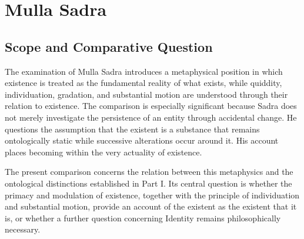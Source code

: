 %
%
%
%

\section{Mulla Sadra}
\label{sec:ch08_s17}



\subsection{Scope and Comparative Question}
\label{subsec:ch08_s17_ss01}

\label{para:VS.B01.P01.C08.S17.SS01.P001}

The examination of Mulla Sadra introduces a metaphysical
position in which existence is treated as the fundamental
reality of what exists, while quiddity, individuation,
gradation, and substantial motion are understood through
their relation to existence. The comparison is especially
significant because Sadra does not merely investigate
the persistence of an entity through accidental change.
He questions the assumption that the existent is a
substance that remains ontologically static while
successive alterations occur around it. His account
places becoming within the very actuality of existence.

The present comparison concerns the relation between
this metaphysics and the ontological distinctions
established in Part I. Its central question is whether
the primacy and modulation of existence, together with
the principle of individuation and substantial motion,
provide an account of the existent as the existent
that it is, or whether a further question concerning
Identity remains philosophically necessary.

